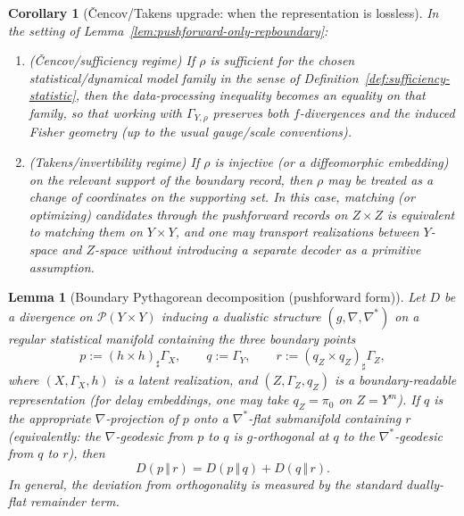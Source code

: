 \documentclass[11pt]{article}
\newtheorem{lemma}{Lemma}
\newtheorem{corollary}{Corollary}
\newcommand{\Pcal}{\mathcal{P}}
\newcommand{\push}{\sharp}     %
\begin{document}
\begin{corollary}[Čencov/Takens upgrade: when the representation is lossless]
\label{cor:cencov-takens-upgrade}
In the setting of Lemma~\ref{lem:pushforward-only-repboundary}:
\begin{enumerate}[label=(\alph*),leftmargin=1.8em]
  \item (\emph{Čencov/sufficiency regime}) If $\rho$ is sufficient for the chosen
  statistical/dynamical model family in the sense of
  Definition~\ref{def:sufficiency-statistic}, then the data-processing
  inequality becomes an equality on that family, so that working with
  $\Gamma_{Y,\rho}$ preserves both $f$-divergences and the induced Fisher
  geometry (up to the usual gauge/scale conventions).
  \item (\emph{Takens/invertibility regime}) If $\rho$ is injective (or a
  diffeomorphic embedding) on the relevant support of the boundary record, then
  $\rho$ may be treated as a change of coordinates on the supporting set.  In
  this case, matching (or optimizing) candidates through the pushforward records
  on $Z\times Z$ is equivalent to matching them on $Y\times Y$, and one may
  transport realizations between $Y$-space and $Z$-space without introducing a
  separate decoder as a primitive assumption.
\end{enumerate}
\end{corollary}

\begin{lemma}[Boundary Pythagorean decomposition (pushforward form)]
\label{lem:boundary-pythagoras-pushforward}
Let $D$ be a divergence on $\Pcal(Y\times Y)$ inducing a dualistic structure
$(g,\nabla,\nabla^\ast)$ on a regular statistical manifold containing the three
boundary points
\[
  p := (h\times h)_{\push}\Gamma_X,\qquad
  q := \Gamma_Y,\qquad
  r := (q_Z\times q_Z)_{\push}\Gamma_Z,
\]
where $(X,\Gamma_X,h)$ is a latent realization, and $(Z,\Gamma_Z,q_Z)$ is a
boundary-readable representation (for delay embeddings, one may take
$q_Z=\pi_0$ on $Z=Y^m$).
If $q$ is the appropriate $\nabla$-projection of $p$ onto a $\nabla^\ast$-flat
submanifold containing $r$ (equivalently: the $\nabla$-geodesic from $p$ to $q$
is $g$-orthogonal at $q$ to the $\nabla^\ast$-geodesic from $q$ to $r$), then
\[
  D(p\,\Vert\,r) = D(p\,\Vert\,q) + D(q\,\Vert\,r).
\]
In general, the deviation from orthogonality is measured by the standard
dually-flat remainder term.
\end{lemma}
\end{document}
